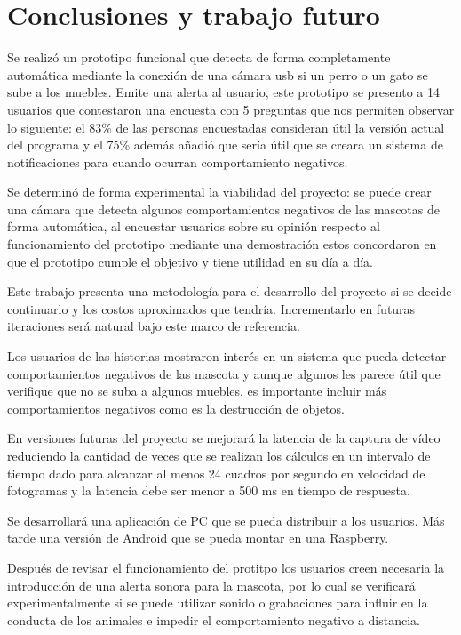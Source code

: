 \section{Conclusiones y trabajo futuro}
\label{sec:conclusiones}

Se realizó un prototipo funcional que detecta de forma completamente automática mediante la conexión de una cámara usb si un perro o un gato se sube a los muebles. Emite una alerta al usuario, este prototipo se presento a 14 usuarios que contestaron una encuesta con 5 preguntas que nos permiten observar lo siguiente:  el 83\% de las personas encuestadas consideran útil la versión actual del programa y el 75\% además añadió que sería útil que se creara un sistema de notificaciones para cuando ocurran comportamiento negativos.

Se determinó de forma experimental la viabilidad del proyecto: se puede crear una cámara que detecta algunos comportamientos negativos de las mascotas de forma automática, al encuestar usuarios sobre su opinión respecto al funcionamiento del prototipo mediante una demostración estos concordaron en que el prototipo cumple el objetivo y tiene utilidad en su día a día.

Este trabajo presenta una metodología para el desarrollo del proyecto si se decide continuarlo y los costos aproximados que tendría. Incrementarlo en futuras iteraciones será natural bajo este marco de referencia.

Los usuarios de las historias mostraron interés en un sistema que pueda detectar comportamientos negativos de las mascota y aunque algunos les parece útil que verifique que no se suba a algunos muebles, es importante incluir más comportamientos negativos como es la destrucción de objetos.

En versiones futuras del proyecto se mejorará la latencia de la captura de vídeo reduciendo la cantidad de veces que se realizan los cálculos en un intervalo de tiempo dado para alcanzar al menos 24 cuadros por segundo en velocidad de fotogramas y la latencia debe ser menor a 500 ms en tiempo de respuesta.

Se desarrollará una aplicación de PC que se pueda distribuir a los usuarios. Más tarde una versión de Android que se pueda montar en una Raspberry.

Después de revisar el funcionamiento del protitpo los usuarios creen necesaria la introducción de una alerta sonora para la mascota, por lo cual se verificará experimentalmente si se puede utilizar sonido o grabaciones para influir en la conducta de los animales e impedir el comportamiento negativo a distancia.

